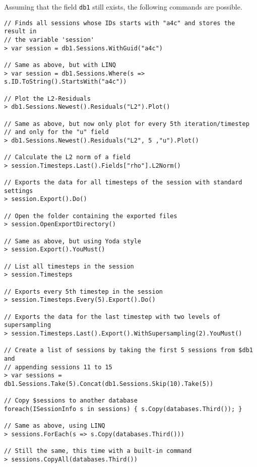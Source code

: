 Assuming that the field \lstinline{db1} still exists, the following commands are possible.
\begin{lstlisting}[title=Advanced Examples]
// Finds all sessions whose IDs starts with "a4c" and stores the result in
// the variable 'session'
> var session = db1.Sessions.WithGuid("a4c")

// Same as above, but with LINQ
> var session = db1.Sessions.Where(s => s.ID.ToString().StartsWith("a4c"))

// Plot the L2-Residuals
> db1.Sessions.Newest().Residuals("L2").Plot()

// Same as above, but now only plot for every 5th iteration/timestep
// and only for the "u" field
> db1.Sessions.Newest().Residuals("L2", 5 ,"u").Plot()

// Calculate the L2 norm of a field
> session.Timesteps.Last().Fields["rho"].L2Norm()

// Exports the data for all timesteps of the session with standard settings
> session.Export().Do()

// Open the folder containing the exported files
> session.OpenExportDirectory()

// Same as above, but using Yoda style
> session.Export().YouMust()

// List all timesteps in the session
> session.Timesteps

// Exports every 5th timestep in the session
> session.Timesteps.Every(5).Export().Do()

// Exports the data for the last timestep with two levels of supersampling
> session.Timesteps.Last().Export().WithSupersampling(2).YouMust()

// Create a list of sessions by taking the first 5 sessions from $db1 and 
// appending sessions 11 to 15
> var sessions = db1.Sessions.Take(5).Concat(db1.Sessions.Skip(10).Take(5))

// Copy $sessions to another database
foreach(ISessionInfo s in sessions) { s.Copy(databases.Third()); }

// Same as above, using LINQ
> sessions.ForEach(s => s.Copy(databases.Third()))

// Still the same, this time with a built-in command
> sessions.CopyAll(databases.Third())

\end{lstlisting}

